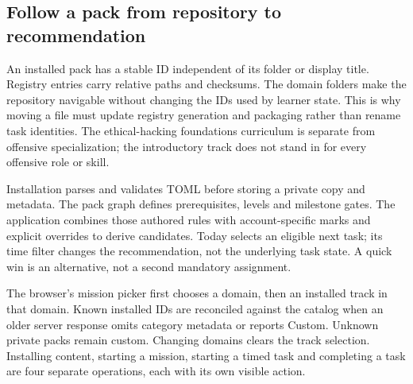 \subsection{Follow a pack from repository to recommendation}
An installed pack has a stable ID independent of its folder or display title.
Registry entries carry relative paths and checksums. The domain folders make the
repository navigable without changing the IDs used by learner state. This is why
moving a file must update registry generation and packaging rather than rename
task identities. The ethical-hacking foundations curriculum is separate from
offensive specialization; the introductory track does not stand in for every
offensive role or skill.

Installation parses and validates TOML before storing a private copy and metadata.
The pack graph defines prerequisites, levels and milestone gates. The application
combines those authored rules with account-specific marks and explicit overrides
to derive candidates. Today selects an eligible next task; its time filter changes
the recommendation, not the underlying task state. A quick win is an alternative,
not a second mandatory assignment.

The browser's mission picker first chooses a domain, then an installed track in
that domain. Known installed IDs are reconciled against the catalog when an older
server response omits category metadata or reports Custom. Unknown private packs
remain custom. Changing domains clears the track selection. Installing content,
starting a mission, starting a timed task and completing a task are four separate
operations, each with its own visible action.

